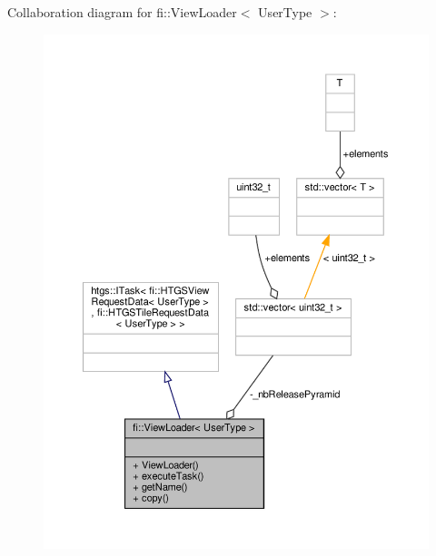 Collaboration diagram for fi\+:\+:View\+Loader$<$ User\+Type $>$\+:
\nopagebreak
\begin{figure}[H]
\begin{center}
\leavevmode
\includegraphics[width=350pt]{d6/dc2/classfi_1_1ViewLoader__coll__graph}
\end{center}
\end{figure}
